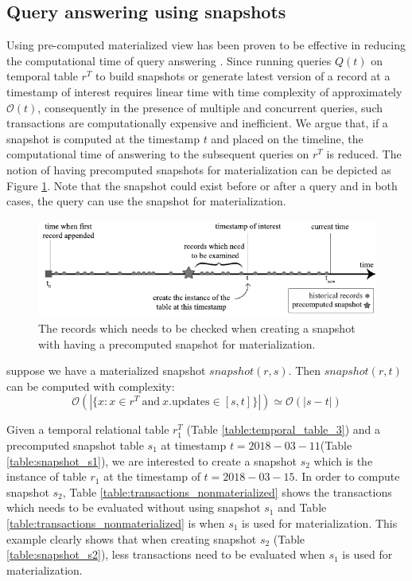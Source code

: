 		\subsection{Query answering using snapshots} 
			Using pre-computed materialized view has been proven to be effective in reducing the computational time of query answering \cite{sohrabi2016materialized} \cite{du2017deepsea}. Since running queries $Q(t)$ on temporal table $r^T$ to build snapshots or generate latest version of a record at a timestamp of interest requires linear time with time complexity of approximately $\mathcal{O}(t)$, consequently in the presence of multiple and concurrent queries, such transactions are computationally expensive and inefficient. We argue that, if a snapshot is computed at the timestamp $t$ and placed on the timeline, the computational time of answering to the subsequent queries on $r^T$ is reduced. The notion of having precomputed snapshots for materialization can be depicted as Figure \ref{fig:snapshot_materialization}. Note that the snapshot could exist before or after a query and in both cases, the query can use the snapshot for materialization.

			\begin{figure}[t]
				\centering
				\includegraphics[width=\textwidth]{figs/snapshot_materialization.pdf}
				\caption{The records which needs to be checked when creating a snapshot with having a precomputed snapshot for materialization.}
				\label{fig:snapshot_materialization}
			\end{figure}

			\begin{prop}
				suppose we have a materialized snapshot $snapshot(r,s)$. Then $snapshot(r,t)$ can be computed with complexity:
				$$\mathcal{O}(|\{x: x\in r^T\mathrm{\ and\ } x.\mathrm{updates} \in [s,t]\}|) \simeq \mathcal{O}(|s-t|)$$
			\label{prop:materialized_snapshot_complexity}
			\end{prop}

			\begin{example}
				Given a temporal relational table $r_1^T$ (Table \ref{table:temporal_table_3}) and a precomputed snapshot table $s_1$ at timestamp $t = 2018-03-11$(Table \ref{table:snapshot_s1}), we are interested to create a snapshot $s_2$ which is the instance of table $r_1$ at the timestamp of $t = 2018-03-15$. In order to compute snapshot $s_2$, Table \ref{table:transactions_nonmaterialized} shows the transactions which needs to be evaluated without using snapshot $s_1$ and Table \ref{table:transactions_nonmaterialized} is when $s_1$ is used for materialization. This example clearly shows that when creating snapshot $s_2$ (Table \ref{table:snapshot_s2}), less transactions need to be evaluated when $s_1$ is used for materialization.
			\label{example:materialized_snapshot_complexity}
			\end{example}

